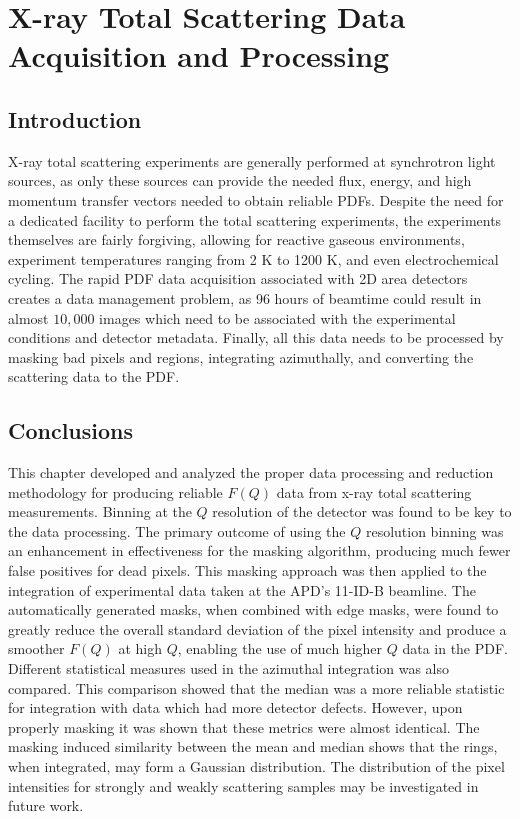 \graphicspath{{dp/figures/}}
\chapter{X-ray Total Scattering Data Acquisition and Processing} \label{ch:dp}
\section{Introduction}
X-ray total scattering experiments are generally performed at synchrotron light sources, as only these sources can provide the needed flux, energy, and high momentum transfer vectors needed to obtain reliable PDFs. \cite{Chupas2003, Dykhne2011}
Despite the need for a dedicated facility to perform the total scattering experiments, the experiments themselves are fairly forgiving, allowing for reactive gaseous environments, experiment temperatures ranging from 2 \si{K} to 1200 \si{K}, and even electrochemical cycling. \cite{Chupas2008, Petkov2013, Redmond2012}
The rapid PDF data acquisition associated with 2D area detectors creates a data management problem, as 96 hours of beamtime could result in almost $10,000$ images which need to be associated with the experimental conditions and detector metadata. \cite{Chupas2003}
 Finally, all this data needs to be processed by masking bad pixels and regions, integrating azimuthally, and converting the scattering data to the PDF. \cite{Kieffer2013, Juhas2013, Yang2014, Pauw2014, Billinge2012}

%







\section{Conclusions}
This chapter developed and analyzed the proper data processing and reduction methodology for producing reliable $F(Q)$ data from x-ray total scattering measurements.
Binning at the $Q$ resolution of the detector was found to be key to the data processing.
The primary outcome of using the $Q$ resolution binning was an enhancement in effectiveness for the masking algorithm, producing much fewer false positives for dead pixels.
This masking approach was then applied to the integration of experimental data taken at the APD's 11-ID-B beamline.
The automatically generated masks, when combined with edge masks, were found to greatly reduce the overall standard deviation of the pixel intensity and produce a smoother $F(Q)$ at high $Q$, enabling the use of much higher $Q$ data in the PDF.
Different statistical measures used in the azimuthal integration was also compared.
This comparison showed that the median was a more reliable statistic for integration with data which had more detector defects.
However, upon properly masking it was shown that these metrics were almost identical.
The masking induced similarity between the mean and median shows that the rings, when integrated, may form a Gaussian distribution.
The distribution of the pixel intensities for strongly and weakly scattering samples may be investigated in future work.